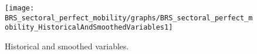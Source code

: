  
\begin{figure}[H]
\centering 
\texttt{[image: BRS\_sectoral\_perfect\_mobility/graphs/BRS\_sectoral\_perfect\_mobility\_HistoricalAndSmoothedVariables1]}
\caption{Historical and smoothed variables.}\label{Fig:HistoricalAndSmoothedVariables:1}
\end{figure}


